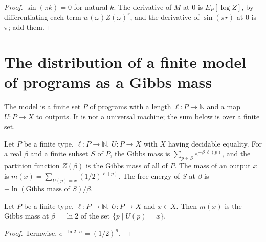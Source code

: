 \begin{proof}
  \leanok
  $\sin(\pi k) = 0$ for natural $k$. The derivative of $M$ at $0$ is $E_P[\log Z]$, by
  differentiating each term $w(\omega) Z(\omega)^r$, and the derivative of $\sin(\pi r)$ at $0$ is
  $\pi$; add them.
\end{proof}

\section{The distribution of a finite model of programs as a Gibbs mass}
\label{sec:physics-solomonoff}

The model is a finite set $P$ of programs with a length $\ell : P \to \mathbb{N}$ and a map
$U : P \to X$ to outputs. It is not a universal machine; the sum below is over a finite set.

\begin{definition}
  \label{def:physics-gibbs}
  \leanok
  Let $P$ be a finite type, $\ell : P \to \mathbb{N}$, $U : P \to X$ with $X$ having decidable
  equality. For a real $\beta$ and a finite subset $S$ of $P$, the Gibbs mass is
  $\sum_{p \in S} e^{-\beta\,\ell(p)}$, and the partition function $Z(\beta)$ is the Gibbs mass of
  all of $P$. The mass of an output $x$ is $m(x) = \sum_{U(p) = x} (1/2)^{\ell(p)}$. The free energy
  of $S$ at $\beta$ is $-\ln(\text{Gibbs mass of } S)/\beta$.
  \own{}
\end{definition}

\begin{theorem}[The mass of an output is a Gibbs mass at $\beta = \ln 2$, in a finite model of programs]
  \label{thm:physics-solomonoff-gibbs}
  \leanok
  Let $P$ be a finite type, $\ell : P \to \mathbb{N}$, $U : P \to X$ and $x \in X$. Then $m(x)$ is
  the Gibbs mass at $\beta = \ln 2$ of the set $\{p \mid U(p) = x\}$.
  \own{}
\end{theorem}

\begin{proof}
  \leanok
  Termwise, $e^{-\ln 2 \cdot n} = (1/2)^n$.
\end{proof}

